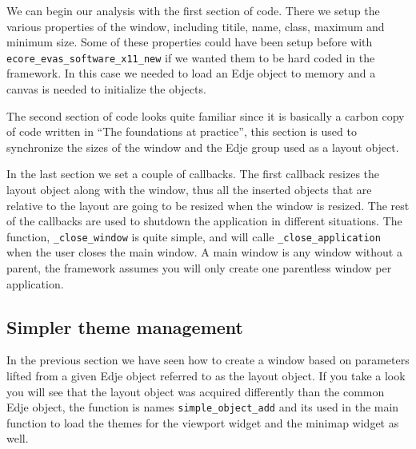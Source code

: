 \documentclass[12pt,a4paper,english]{book}
\begin{document}
We can begin our analysis with the first section of code. There we setup the
various properties of the window, including titile, name, class, maximum and
minimum size. Some of these properties could have been setup before
with \texttt{ecore{\_}evas{\_}software{\_}x11{\_}new} if we wanted them to be hard coded in the
framework. In this case we needed to load an Edje object to memory and a canvas
is needed to initialize the objects.

The second section of code looks quite familiar since it is basically a carbon
copy of code written in ``The foundations at practice'', this section is used to
synchronize the sizes of the window and the Edje group used as a layout object.

In the last section we set a couple of callbacks. The first callback resizes
the layout object along with the window, thus all the inserted objects that are
relative to the layout are going to be resized when the window is resized. The
rest of the callbacks are used to shutdown the application in different
situations. The function, \texttt{{\_}close{\_}window} is quite simple, and will calle
\texttt{{\_}close{\_}application} when the user closes the main window. A main window is
any window without a parent, the framework assumes you will only create one
parentless window per application.



\hypertarget{simpler-theme-management}{}
\subsection{Simpler theme management}

In the previous section we have seen how to create a window based on parameters
lifted from a given Edje object referred to as the layout object. If you take
a look you will see that the layout object was acquired differently than the
common Edje object, the function is names \texttt{simple{\_}object{\_}add} and its used
in the main function to load the themes for the viewport widget and the minimap
widget as well.
\end{document}
